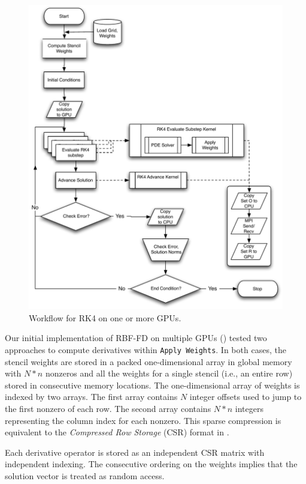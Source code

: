 \documentclass{report}
\begin{document}
\begin{figure}[ht]
      \centering
       \includegraphics[width=5in]{../figures/paper1/figures/omnigraffle/RK4_multi_GPU_flow.pdf}
      \caption{Workflow for RK4 on one or more GPUs. }
      \label{fig:multi_GPU_flow}
\end{figure}
 
Our initial implementation of RBF-FD on multiple GPUs (\cite{BolligFlyerErlebacher2012}) tested two approaches to compute derivatives within \texttt{Apply Weights}. 
In both cases, the stencil weights are stored in  
a packed one-dimensional array in global memory with $N*n$ nonzeros and all the weights 
for a single stencil (i.e., an entire row) stored in consecutive memory locations. The one-dimensional array of weights is indexed by two arrays. The first array contains $N$ integer offsets used to jump to the first nonzero of each row. The second array contains $N*n$ integers representing the column index for each nonzero. This sparse compression is equivalent to the \emph{Compressed Row Storage} (CSR) format in \cite{Bell2009, Rupp2010, Cusp2012}.

Each derivative operator is stored as an independent CSR matrix with independent indexing. The consecutive ordering on the weights implies that the solution vector %
is treated as random access.  %
\end{document}
